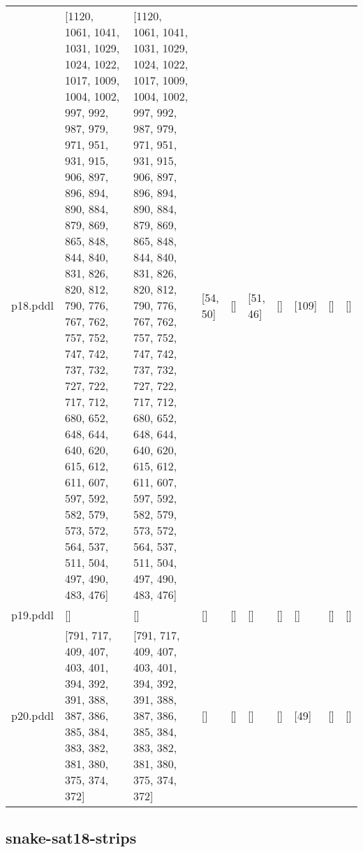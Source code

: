 \documentclass{article}
\begin{document}
\begin{tabular}{@{}lrrrrrrrrr@{}}
p18.pddl & \multicolumn{1}{|l|}{[1120, 1061, 1041, 1031, 1029, 1024, 1022, 1017, 1009, 1004, 1002, 997, 992, 987, 979, 971, 951, 931, 915, 906, 897, 896, 894, 890, 884, 879, 869, 865, 848, 844, 840, 831, 826, 820, 812, 790, 776, 767, 762, 757, 752, 747, 742, 737, 732, 727, 722, 717, 712, 680, 652, 648, 644, 640, 620, 615, 612, 611, 607, 597, 592, 582, 579, 573, 572, 564, 537, 511, 504, 497, 490, 483, 476]} & \multicolumn{1}{|l|}{[1120, 1061, 1041, 1031, 1029, 1024, 1022, 1017, 1009, 1004, 1002, 997, 992, 987, 979, 971, 951, 931, 915, 906, 897, 896, 894, 890, 884, 879, 869, 865, 848, 844, 840, 831, 826, 820, 812, 790, 776, 767, 762, 757, 752, 747, 742, 737, 732, 727, 722, 717, 712, 680, 652, 648, 644, 640, 620, 615, 612, 611, 607, 597, 592, 582, 579, 573, 572, 564, 537, 511, 504, 497, 490, 483, 476]} & \multicolumn{1}{|l|}{[54, 50]} & \multicolumn{1}{|l|}{[]} & \multicolumn{1}{|l|}{[51, 46]} & \multicolumn{1}{|l|}{[]} & \multicolumn{1}{|l|}{[109]} & \multicolumn{1}{|l|}{[]} & \multicolumn{1}{|l|}{[]} \\
p19.pddl & \multicolumn{1}{|l|}{[]} & \multicolumn{1}{|l|}{[]} & \multicolumn{1}{|l|}{[]} & \multicolumn{1}{|l|}{[]} & \multicolumn{1}{|l|}{[]} & \multicolumn{1}{|l|}{[]} & \multicolumn{1}{|l|}{[]} & \multicolumn{1}{|l|}{[]} & \multicolumn{1}{|l|}{[]} \\
p20.pddl & \multicolumn{1}{|l|}{[791, 717, 409, 407, 403, 401, 394, 392, 391, 388, 387, 386, 385, 384, 383, 382, 381, 380, 375, 374, 372]} & \multicolumn{1}{|l|}{[791, 717, 409, 407, 403, 401, 394, 392, 391, 388, 387, 386, 385, 384, 383, 382, 381, 380, 375, 374, 372]} & \multicolumn{1}{|l|}{[]} & \multicolumn{1}{|l|}{[]} & \multicolumn{1}{|l|}{[]} & \multicolumn{1}{|l|}{[]} & \multicolumn{1}{|l|}{[49]} & \multicolumn{1}{|l|}{[]} & \multicolumn{1}{|l|}{[]} \\
\end{tabular}

\hypertarget{h_values-snake-sat18-strips}{}
\subsection*{snake-sat18-strips}
\end{document}
